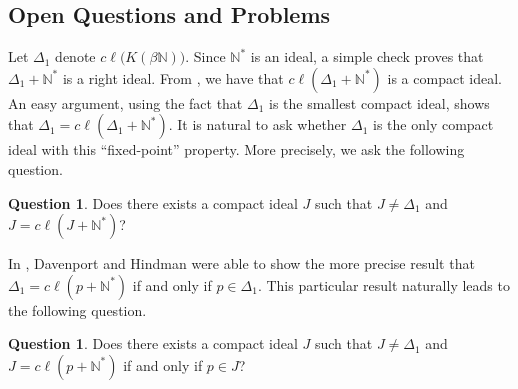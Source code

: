 \documentclass[12pt]{article}
\theoremstyle{plain}
\theoremstyle{definition}
\newtheorem{ques}[thm]{Question}
\newcommand{\bbN}{\mathbb{N}}
\begin{document}
\subsection{Open Questions and Problems}
Let $\Delta_1$ denote $c\ell\bigl(K(\beta\bbN)\bigr)$.
Since $\bbN^*$ is an ideal, a simple check proves that $\Delta_1 +
\bbN^*$ is a right ideal.
From \cite[Theorem 2.19(a)]{Hindman:1998fk}, we have that
$c\ell(\Delta_1 + \bbN^*)$ is a compact ideal.
An easy argument, using the fact that $\Delta_1$ is the smallest
compact ideal, shows that $\Delta_1 = c\ell(\Delta_1+\bbN^*)$.
It is natural to ask whether $\Delta_1$ is the only compact
ideal with this ``fixed-point'' property.
More precisely, we ask the following question.
\begin{ques}
  Does there exists a compact ideal $J$ such that $J \ne \Delta_1$ and
  $J = c\ell(J+\bbN^*)$?
\end{ques}
In \cite[Lemma 3.3]{Davenport:1987uq}, Davenport and Hindman were able
to show the more precise result that $\Delta_1 = c\ell(p+\bbN^*)$ if
and only if $p \in \Delta_1$.
This particular result naturally leads to the following question.
\begin{ques}
  Does there exists a compact ideal $J$ such that $J \ne \Delta_1$ and
  $J = c\ell(p + \bbN^*)$ if and only if $p \in J$?
\end{ques}
\end{document}
